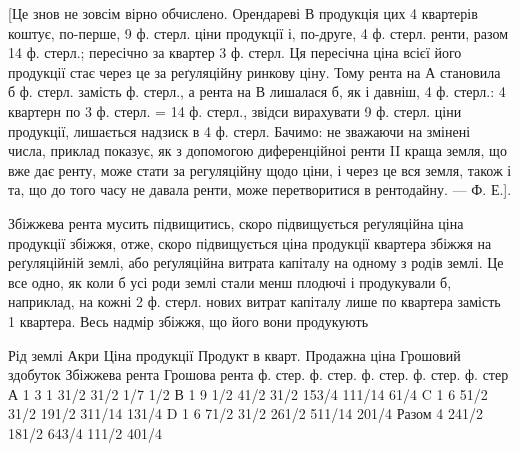[Це знов не зовсім вірно обчислено. Орендареві $В$ продукція цих 4 квартерів
коштує, по-перше, 9 ф. стерл. ціни продукції і, по-друге,
4 ф. стерл. ренти, разом 14 ф. стерл.; пересічно за квартер 3 ф. стерл.
Ця пересічна ціна всієї його продукції стає через це за реґуляційну ринкову ціну. Тому рента на
$А$ становила б  ф. стерл. замість  ф. стерл., а рента на $В$ лишалася б, як і давніш, 4 ф.
стерл.: 4 квартерн по 3 ф. стерл. = 14 ф. стерл., звідси вирахувати
9 ф. стерл. ціни продукції, лишається надзиск в 4 ф. стерл. Бачимо: не
зважаючи на змінені числа, приклад показує, як з допомогою диференційноі
ренти II краща земля, що вже дає ренту, може стати за регуляційну щодо ціни,
і через це вся земля, також і та, що до того часу не давала ренти, може перетворитися
в рентодайну. — Ф. Е.].

Збіжжева рента мусить підвищитись, скоро підвищується реґуляційна
ціна продукції збіжжя, отже, скоро підвищується ціна продукції квартера збіжжя
на реґуляційній землі, або реґуляційна витрата капіталу на одному з родів
землі. Це все одно, як коли б усі роди землі стали менш плодючі і продукували
б, наприклад, на кожні 2 ф. стерл. нових витрат капіталу лише по 
квартера замість 1 квартера. Весь надмір збіжжя, що його вони продукують

Рід землі    Акри    Ціна продукції    Продукт в кварт. Продажна  ціна    Грошовий  здобуток
Збіжжева рента    Грошова  рента
        ф. стер. ф. стер. ф. стер. ф. стер. ф. стер
А                    1    3             1            31/2       31/2        1/7            1/2
В                    1    9 1/2       41/2    31/2       153/4        111/14    61/4
C                    1    6             51/2    31/2        191/2        311/14    131/4
D                    1    6             71/2    31/2        261/2        511/14     201/4
Разом           4    241/2    181/2           643/4    111/2            401/4
\parbreak{}  %
